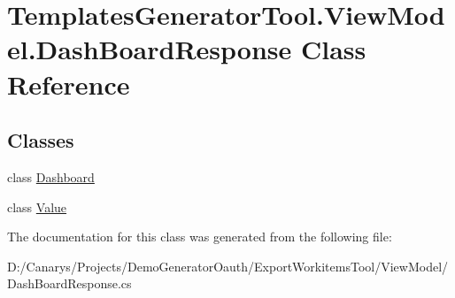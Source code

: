 \hypertarget{class_templates_generator_tool_1_1_view_model_1_1_dash_board_response}{}\section{Templates\+Generator\+Tool.\+View\+Model.\+Dash\+Board\+Response Class Reference}
\label{class_templates_generator_tool_1_1_view_model_1_1_dash_board_response}
\subsection*{Classes}
\begin{DoxyCompactItemize}
\item 
class \mbox{\hyperlink{class_templates_generator_tool_1_1_view_model_1_1_dash_board_response_1_1_dashboard}{Dashboard}}
\item 
class \mbox{\hyperlink{class_templates_generator_tool_1_1_view_model_1_1_dash_board_response_1_1_value}{Value}}
\end{DoxyCompactItemize}


The documentation for this class was generated from the following file\+:\begin{DoxyCompactItemize}
\item 
D\+:/\+Canarys/\+Projects/\+Demo\+Generator\+Oauth/\+Export\+Workitems\+Tool/\+View\+Model/Dash\+Board\+Response.\+cs\end{DoxyCompactItemize}
